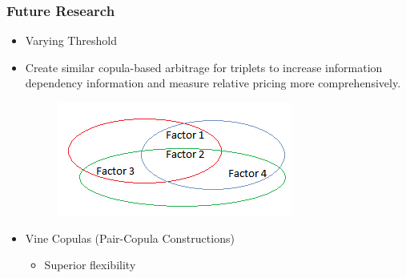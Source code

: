 \documentclass[pdf,9pt,xcolor=dvipsnames,hide notes]{beamer}
\begin{document}
\begin{frame}
	\frametitle{Future Research}
	
\begin{itemize}
	\item Varying Threshold
	
	\vspace{0.3cm}
	
	\item Create similar copula-based arbitrage for triplets to increase information dependency information and measure relative pricing more comprehensively.
	
		\begin{figure}[htbp]
		\centering
		\includegraphics[scale=0.6]{fig4.png}
		\label{fig:fig4}
	\end{figure}

	\item Vine Copulas (Pair-Copula Constructions)
	
	\begin{itemize}
		\item Superior flexibility
	\end{itemize}
	
\end{itemize}
	
\end{frame}
\end{document}
